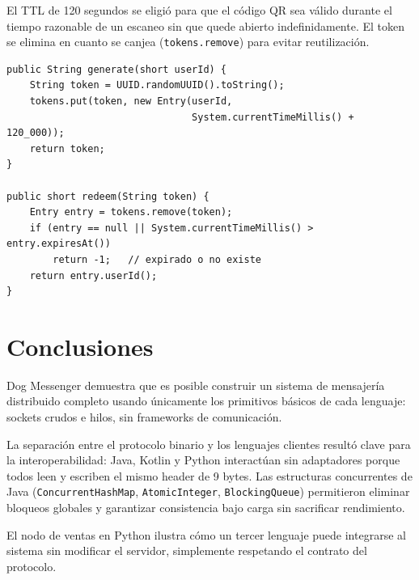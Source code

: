 \documentclass[12pt,a4paper]{article}
\begin{document}
El TTL de 120 segundos se eligió para que el código QR sea válido durante
el tiempo razonable de un escaneo sin que quede abierto indefinidamente.
El token se elimina en cuanto se canjea (\texttt{tokens.remove}) para evitar
reutilización.

\begin{lstlisting}[style=java, caption={QrTokenStore.java --- tokens con TTL de 120s}]
public String generate(short userId) {
    String token = UUID.randomUUID().toString();
    tokens.put(token, new Entry(userId,
                                System.currentTimeMillis() + 120_000));
    return token;
}

public short redeem(String token) {
    Entry entry = tokens.remove(token);
    if (entry == null || System.currentTimeMillis() > entry.expiresAt())
        return -1;   // expirado o no existe
    return entry.userId();
}
\end{lstlisting}

\section{Conclusiones}

Dog Messenger demuestra que es posible construir un sistema de mensajería
distribuido completo usando únicamente los primitivos básicos de cada
lenguaje: sockets crudos e hilos, sin frameworks de comunicación.

La separación entre el protocolo binario y los lenguajes clientes resultó
clave para la interoperabilidad: Java, Kotlin y Python interactúan sin
adaptadores porque todos leen y escriben el mismo header de 9 bytes.
Las estructuras concurrentes de Java (\texttt{ConcurrentHashMap},
\texttt{AtomicInteger}, \texttt{BlockingQueue}) permitieron eliminar
bloqueos globales y garantizar consistencia bajo carga sin sacrificar
rendimiento.

El nodo de ventas en Python ilustra cómo un tercer lenguaje puede integrarse
al sistema sin modificar el servidor, simplemente respetando el contrato
del protocolo.
\end{document}
